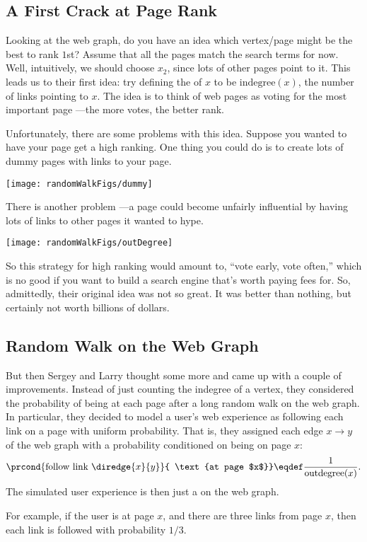 \subsection{A First Crack at Page Rank}

Looking at the web graph, do you have an idea which vertex/page might
be the best to rank $1$st?  Assume that all the pages match the search
terms for now.  Well, intuitively, we should choose $x_2$, since lots
of other pages point to it.  This leads us to their first idea: try
defining the  of $x$ to be $\text{indegree}(x)$, the
number of links pointing to $x$.  The idea is to think of web pages as
voting for the most important page ---the more votes, the better rank.

Unfortunately, there are some problems with this idea.  Suppose you wanted
to have your page get a high ranking.  One thing you could do is to
create lots of dummy pages with links to your page.

\texttt{[image: randomWalkFigs/dummy]}

There is another problem ---a page could become unfairly influential by
having lots of links to other pages it wanted to hype.

\texttt{[image: randomWalkFigs/outDegree]}

So this strategy for high ranking would amount to, ``vote early, vote
often,'' which is no good if you want to build a search engine that's
worth paying fees for.  So, admittedly, their original idea was not so
great.  It was better than nothing, but certainly not worth billions of
dollars.

\subsection{Random Walk on the Web Graph}

But then Sergey and Larry thought some more and came up with a couple of
improvements.  Instead of just counting the indegree of a vertex, they
considered the probability of being at each page after a long random walk
on the web graph.  In particular, they decided to model a user's web
experience as following each link on a page with uniform probability.
That is, they assigned each edge $x \rightarrow y$ of the web graph with a
probability conditioned on being on page $x$:
\[
\prcond{\text{follow link}\ \diredge{x}{y}}{ \text{at page $x$}} \eqdef
\frac{1}{\text{outdegree}(x)}.
\]
The simulated user experience is then just a  on the
web graph.
\begin{editingnotes}

For example, if the user is at page $x$, and there are three links from
page $x$, then each link is followed with probability $1/3$.
\end{editingnotes}


